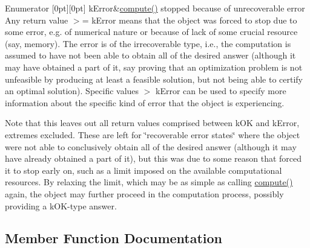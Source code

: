 \begin{DoxyEnumFields}{Enumerator}
[0pt][0pt]{}\mbox{\label{class_s_m_spp__di__unipi__it_1_1_thin_compute_interface_af53bf2e56537fb2e10afe53b17ba1080aacb2c04376333850bff6fb1065c0c171}} 
k\+Error&\mbox{\hyperlink{class_s_m_spp__di__unipi__it_1_1_thin_compute_interface_a00fd6363d98ea46bcc273842b327d050}{compute()}} stopped because of unrecoverable error Any return value $>$= k\+Error means that the object was forced to stop due to some error, e.\+g. of numerical nature or because of lack of some crucial resource (say, memory). The error is of the irrecoverable type, i.\+e., the computation is assumed to have not been able to obtain all of the desired answer (although it may have obtained a part of it, say proving that an optimization problem is not unfeasible by producing at least a feasible solution, but not being able to certify an optimal solution). Specific values $>$ k\+Error can be used to specify more information about the specific kind of error that the object is experiencing.

Note that this leaves out all return values comprised between k\+OK and k\+Error, extremes excluded. These are left for \char`\"{}recoverable error states\char`\"{} where the object were not able to conclusively obtain all of the desired answer (although it may have already obtained a part of it), but this was due to some reason that forced it to stop early on, such as a limit imposed on the available computational resources. By relaxing the limit, which may be as simple as calling \mbox{\hyperlink{class_s_m_spp__di__unipi__it_1_1_thin_compute_interface_a00fd6363d98ea46bcc273842b327d050}{compute()}} again, the object may further proceed in the computation process, possibly providing a k\+O\+K-\/type answer. \\
\hline

\end{DoxyEnumFields}


\subsection{Member Function Documentation}
\mbox{\label{class_s_m_spp__di__unipi__it_1_1_thin_compute_interface_a00fd6363d98ea46bcc273842b327d050}} 
